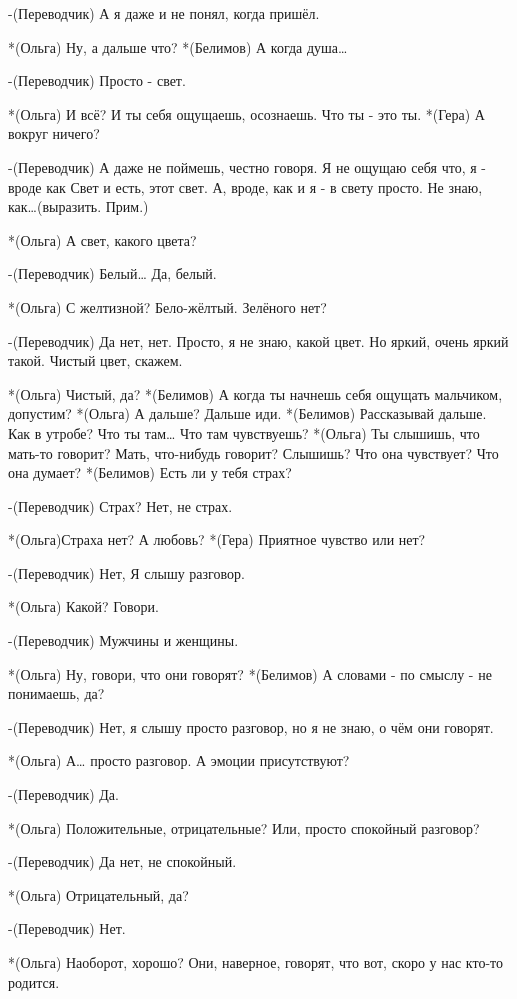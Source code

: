 -(Переводчик) А я даже и не понял, когда пришёл.

*(Ольга) Ну, а дальше что?
*(Белимов) А когда душа…

-(Переводчик) Просто - свет.

*(Ольга) И всё? И ты себя ощущаешь, осознаешь. Что ты - это ты.
*(Гера) А вокруг ничего?

-(Переводчик) А даже не поймешь, честно говоря. Я не ощущаю себя что, я - вроде как Свет и есть, этот свет. А, вроде, как и я - в свету просто. Не знаю, как…(выразить. Прим.)

*(Ольга) А свет, какого цвета?

-(Переводчик) Белый… Да, белый.

*(Ольга) С желтизной? Бело-жёлтый. Зелёного нет?

-(Переводчик) Да нет, нет. Просто, я  не знаю, какой цвет. Но яркий, очень яркий такой. Чистый цвет, скажем.

*(Ольга) Чистый, да?
*(Белимов) А когда ты начнешь себя ощущать мальчиком, допустим?
*(Ольга) А дальше? Дальше иди.
*(Белимов) Рассказывай дальше. Как в утробе?  Что ты там… Что там чувствуешь?
*(Ольга) Ты слышишь, что мать-то говорит? Мать, что-нибудь говорит? Слышишь? Что она чувствует? Что она думает?
*(Белимов) Есть ли у тебя страх?

-(Переводчик) Страх? Нет, не страх.

*(Ольга)Страха нет? А любовь? 
*(Гера) Приятное чувство или нет?

-(Переводчик) Нет, Я слышу разговор.

*(Ольга) Какой? Говори.

-(Переводчик) Мужчины и женщины.

*(Ольга) Ну, говори, что они говорят?
*(Белимов) А словами - по смыслу - не понимаешь, да?

-(Переводчик) Нет, я слышу просто разговор, но я не знаю, о чём они говорят.

*(Ольга) А… просто разговор. А эмоции присутствуют?

-(Переводчик) Да.

*(Ольга) Положительные, отрицательные? Или, просто спокойный разговор?

-(Переводчик) Да нет, не спокойный.

*(Ольга) Отрицательный, да?

-(Переводчик) Нет.

*(Ольга) Наоборот, хорошо? Они, наверное, говорят, что вот, скоро у нас кто-то родится.

